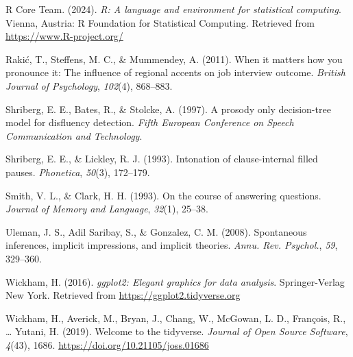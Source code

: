 \documentclass[
  man,floatsintext]{apa7}
\newlength{\cslhangindent}
\newlength{\cslentryspacingunit} %
\newenvironment{CSLReferences}[2] %
 {%
  \setlength{\parindent}{0pt}
  \ifodd #1
  \let\oldpar\par
  \def\par{\hangindent=\cslhangindent\oldpar}
  \fi
  \setlength{\parskip}{#2\cslentryspacingunit}
 }%
 {}
\begin{document}
\begin{CSLReferences}{1}{0}
\leavevmode{}%
R Core Team. (2024). \emph{R: A language and environment for statistical computing}. Vienna, Austria: R Foundation for Statistical Computing. Retrieved from \url{https://www.R-project.org/}

\leavevmode{}%
Rakić, T., Steffens, M. C., \& Mummendey, A. (2011). When it matters how you pronounce it: The influence of regional accents on job interview outcome. \emph{British Journal of Psychology}, \emph{102}(4), 868--883.

\leavevmode{}%
Shriberg, E. E., Bates, R., \& Stolcke, A. (1997). A prosody only decision-tree model for disfluency detection. \emph{Fifth European Conference on Speech Communication and Technology}.

\leavevmode{}%
Shriberg, E. E., \& Lickley, R. J. (1993). Intonation of clause-internal filled pauses. \emph{Phonetica}, \emph{50}(3), 172--179.

\leavevmode{}%
Smith, V. L., \& Clark, H. H. (1993). On the course of answering questions. \emph{Journal of Memory and Language}, \emph{32}(1), 25--38.

\leavevmode{}%
Uleman, J. S., Adil Saribay, S., \& Gonzalez, C. M. (2008). Spontaneous inferences, implicit impressions, and implicit theories. \emph{Annu. Rev. Psychol.}, \emph{59}, 329--360.

\leavevmode{}%
Wickham, H. (2016). \emph{ggplot2: Elegant graphics for data analysis}. Springer-Verlag New York. Retrieved from \url{https://ggplot2.tidyverse.org}

\leavevmode{}%
Wickham, H., Averick, M., Bryan, J., Chang, W., McGowan, L. D., François, R., \ldots{} Yutani, H. (2019). Welcome to the {tidyverse}. \emph{Journal of Open Source Software}, \emph{4}(43), 1686. \url{https://doi.org/10.21105/joss.01686}

\end{CSLReferences}


\clearpage
\renewcommand{\listfigurename}{Figure captions}

\clearpage
\renewcommand{\listtablename}{Table captions}
\end{document}
